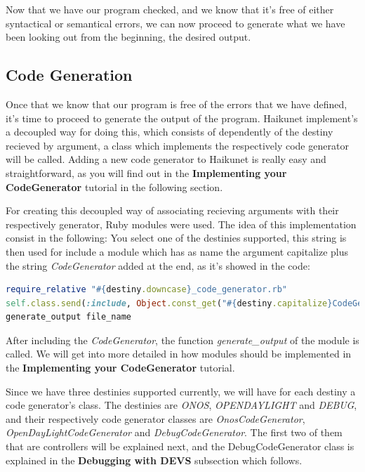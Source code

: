 Now that we have our program checked, and we know that it's free of either syntactical or semantical errors, we can now proceed to generate what we have been looking out from the beginning, the desired output.

\subsection{Code Generation}

Once that we know that our program is free of the errors that we have defined, it's time to proceed to generate the output of the program. Haikunet implement's a decoupled way for doing this, which consists of dependently of the destiny recieved by argument, a class which implements the respectively code generator will be called. Adding a new code generator to Haikunet is really easy and straightforward, as you will find out in the \textbf{Implementing your CodeGenerator} tutorial in the following section.

For creating this decoupled way of associating recieving arguments with their respectively generator, Ruby modules were used. The idea of this implementation consist in the following: You select one of the destinies supported, this string is then used for include a module which has as name the argument capitalize plus the string \textit{CodeGenerator} added at the end, as it's showed in the code:

\begin{lstlisting}[language=Ruby,breaklines=true]
require_relative "#{destiny.downcase}_code_generator.rb"
self.class.send(:include, Object.const_get("#{destiny.capitalize}CodeGenerator"))
generate_output file_name
\end{lstlisting}

After including the \textit{CodeGenerator}, the function \textit{generate\_output} of the module is called. We will get into more detailed in how modules should be implemented in the \textbf{Implementing your CodeGenerator} tutorial.

Since we have three destinies supported currently, we will have for each destiny a code generator's class. The destinies are \textit{ONOS}, \textit{OPENDAYLIGHT} and \textit{DEBUG}, and their respectively code generator classes are \textit{OnosCodeGenerator}, \textit{OpenDayLightCodeGenerator} and \textit{DebugCodeGenerator}.
 The first two of them that are controllers will be explained next, and the DebugCodeGenerator class is explained in the \textbf{Debugging with DEVS} subsection which follows.

